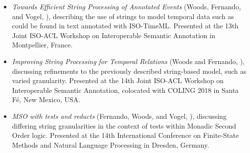 \documentclass[a4paper,12pt,leqno]{article}
\begin{document}
\begin{itemize}
	\item \textit{Towards Efficient String Processing of Annotated Events} (Woods, Fernando, and Vogel, \citeyear{woods2017towards}), describing the use of strings to model temporal data such as could be found in text annotated with ISO-TimeML. Presented at the 13th Joint ISO-ACL Workshop on Interoperable Semantic Annotation in Montpellier, France.
	\item \textit{Improving String Processing for Temporal Relations} (Woods and Fernando, \citeyear{woods2018improving}), discussing refinements to the previously described string-based model, such as varied granularity. Presented at the 14th Joint ISO-ACL Workshop on Interoperable Semantic Annotation, colocated with COLING 2018 in Santa F\'{e}, New Mexico, USA.
	\item \textit{MSO with tests and reducts} (Fernando, Woods, and Vogel, \citeyear{fernando2019mso}), discussing differing string granularities in the context of tests within Monadic Second Order logic. Presented at the 14th International Conference on Finite-State Methods and Natural Language Processing in Dresden, Germany.
\end{itemize}
\newpage
{}
\tableofcontents
\newpage
\listoffigures
\listoftables
\newpage
{}
\end{document}
